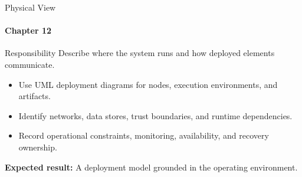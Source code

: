 \begin{frame}{Physical View}
\framesubtitle{Chapter 12}
\begin{block}{Responsibility}
Describe where the system runs and how deployed elements communicate.
\end{block}
\begin{itemize}
  \item Use UML deployment diagrams for nodes, execution environments, and artifacts.
  \item Identify networks, data stores, trust boundaries, and runtime dependencies.
  \item Record operational constraints, monitoring, availability, and recovery ownership.
\end{itemize}
\vspace{0.15cm}
\textbf{Expected result:} A deployment model grounded in the operating environment.
\end{frame}
